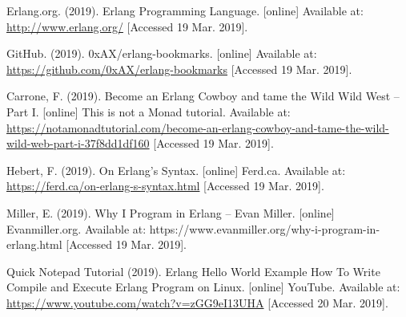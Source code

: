 \documentclass[11 pt]{IEEEtran}
\begin{document}
  
\begin{thebibliography}{99}
Erlang.org. (2019). Erlang Programming Language. [online] Available at: \url{http://www.erlang.org/} [Accessed 19 Mar. 2019].

GitHub. (2019). 0xAX/erlang-bookmarks. [online] Available at: \url{https://github.com/0xAX/erlang-bookmarks} [Accessed 19 Mar. 2019].

Carrone, F. (2019). Become an Erlang Cowboy and tame the Wild Wild West -- Part I. [online] This is not a Monad tutorial. Available at: \url{https://notamonadtutorial.com/become-an-erlang-cowboy-and-tame-the-wild-wild-web-part-i-37f8dd1df160} [Accessed 19 Mar. 2019].

Hebert, F. (2019). On Erlang's Syntax. [online] Ferd.ca. Available at: \url{https://ferd.ca/on-erlang-s-syntax.html} [Accessed 19 Mar. 2019].

Miller, E. (2019). Why I Program in Erlang – Evan Miller. [online] Evanmiller.org. Available at: https://www.evanmiller.org/why-i-program-in-erlang.html [Accessed 19 Mar. 2019].

Quick Notepad Tutorial (2019). Erlang Hello World Example How To Write Compile and Execute Erlang Program on Linux. [online] YouTube. Available at: \url{https://www.youtube.com/watch?v=zGG9eI13UHA} [Accessed 20 Mar. 2019].

\end{thebibliography}
\end{document}
